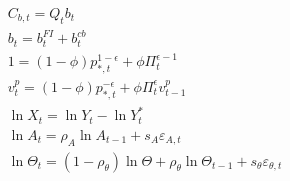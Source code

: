 \documentclass[../../entrega.tex]{subfiles}
\begin{document}
\begin{gather}
    C_{b, t}=Q_{t} b_{t}\label{eq:a-11} \tag{A.11}\\
    b_t = b_t^{FI} + b_t^{cb} \label{eq:a-9} \tag{A.9}\\
    1=(1-\phi) p_{*, t}^{1-\epsilon}+\phi \Pi_{t}^{\epsilon-1}\label{eq:a-4} \tag{A.4}\\
    v_{t}^{p}=(1-\phi) p_{*, t}^{-\epsilon}+\phi \Pi_{t}^{\epsilon} v_{t-1}^{p} \label{eq:a-5}\tag{A.5}\\
    \ln X_t = \ln Y_t - \ln Y_t^* \label{eq:a-16} \tag{A.16}\\
    \ln A_{t}=\rho_{A} \ln A_{t-1}+s_{A} \varepsilon_{A, t}\label{eq:a-12}  \tag{A.12}\\
    \ln \Theta_{t}=\left(1-\rho_{\theta}\right) \ln \Theta+\rho_{\theta} \ln \Theta_{t-1}+s_{\theta} \varepsilon_{\theta, t}\label{eq:a-13} \tag{A.13}
\end{gather}
\end{document}
